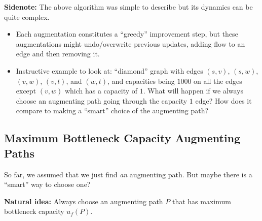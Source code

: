 \documentclass{article}
\begin{document}
\textbf{Sidenote:} The above algorithm was simple to describe but its dynamics can be quite complex.
\begin{itemize}
	\item Each augmentation constitutes a ``greedy'' improvement step, but these augmentations might undo/overwrite previous updates, adding flow to an edge and then removing it. 
	\item Instructive example to look at: ``diamond'' graph with edges $(s, v)$, $(s,w)$, $(v,w)$, $(v,t)$, and $(w,t)$, and capacities being $1000$ on all the edges except $(v,w)$ which has a capacity of $1$. What will happen if we always choose an augmenting path going through the capacity $1$ edge? How does it compare to making a ``smart'' choice of the augmenting path?
\end{itemize}

\subsection{Maximum Bottleneck Capacity Augmenting Paths}

So far, we assumed that we just find {\em an} augmenting path. But maybe there is a ``smart'' way to choose one?

\textbf{Natural idea:} Always choose an augmenting path $P$ that has maximum bottleneck capacity $u_f(P)$.
\end{document}
